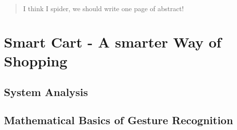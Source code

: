 \documentclass[12pt, a4paper, oneside, british]{report}
\begin{document}
\onehalfspacing
\setlength\epigraphrule{0pt}
\setlength{\epigraphwidth}{0.8\textwidth}
\renewcommand{\epigraphflush}{flushleft}




\tableofcontents 
\newpage

\setcounter{page}{1}

\begin{abstract}
I think I spider, we should write one page of abstract!
\end{abstract}

\chapter{Smart Cart - A smarter Way of Shopping}



\section{System Analysis}



\section{Mathematical Basics of Gesture Recognition}



\end{document}
